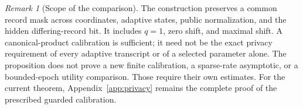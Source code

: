 \documentclass[a4paper,11pt]{article}
\theoremstyle{remark}
\newtheorem{remark}[theorem]{Remark}
\begin{document}
\begin{remark}[Scope of the comparison]
The construction preserves a common record mask across coordinates,
adaptive states, public normalization, and the hidden differing-record
bit. It includes $q=1$, zero shift, and maximal shift. A canonical-product
calibration is sufficient; it need not be the exact privacy requirement
of every adaptive transcript or of a selected parameter alone.
The proposition does not prove a new finite calibration, a sparse-rate
asymptotic, or a bounded-epoch utility comparison. Those require their own
estimates. For the current theorem, Appendix~\ref{app:privacy} remains the
complete proof of the prescribed guarded calibration.
\end{remark}
\end{document}
